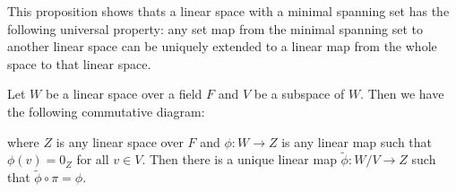 \documentclass[
	11pt, %
	fleqn, %
	a4paper, %
]{LegrandOrangeBook}
\newcommand{\quotient}[2]{#1\! / #2} %
\begin{document}
This proposition shows thats a linear space with a minimal spanning set has the following universal property: any set map from the minimal spanning set to another linear space can be uniquely extended to a linear map from the whole space to that linear space.

\begin{center}
\end{center}

\begin{proposition}
    Let $W$ be a linear space over a field $F$ and $V$ be a subspace of $W$. Then we have the following commutative diagram:
    \begin{center}
    \end{center}
    where $Z$ is any linear space over $F$ and $\phi : W \to Z$ is any linear map such that $\phi(v) = 0_Z$ for all $v \in V$. Then there is a unique linear map $\tilde{\phi} : \quotient{W}{V} \to Z$ such that $\tilde{\phi} \circ \pi = \phi$.
\end{proposition}
\end{document}
